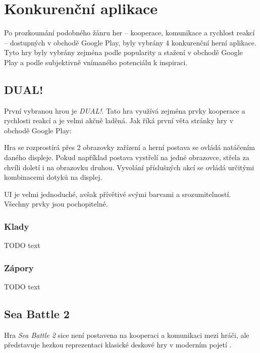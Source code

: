 \chapter{Konkurenční aplikace}

Po prozkoumání podobného žánru her
– kooperace, komunikace a rychlost reakcí –
dostupných v obchodě Google Play,
byly vybrány 4 konkurenční herní aplikace.
Tyto hry byly vybrány zejména podle popularity a stažení v obchodě Google Play
a podle subjektivně vnímaného potenciálu k inspiraci.

\section{DUAL!}

První vybranou hrou je \emph{DUAL!}.
Tato hra využívá zejména prvky kooperace a rychlosti reakcí
a je velmi akčně laděná.
Jak říká první věta stránky hry \cite{seabaa_dual} v obchodě Google Play:

Hra se rozprostírá přes 2 obrazovky zařízení a herní postava se ovládá natáčením
daného displeje.
Pokud například postava vystřelí na jedné obrazovce,
střela za chvíli doletí i na obrazovku druhou.
Vyvolání příslušných akcí se ovládá určitými kombinacemi dotyků na displej.

UI je velmi jednoduché, avšak přívětivé svými barvami a srozumitelností.
Všechny prvky jsou pochopitelné.


\subsection{Klady}

TODO text

\subsection{Zápory}

TODO text

\section{Sea Battle 2}

Hra \emph{Sea Battle 2} sice není postavena na kooperaci a komunikaci mezi
hráči,
ale představuje hezkou reprezentaci klasické deskové hry v moderním pojetí
\cite{henrysmithinc_spaceteam}.

